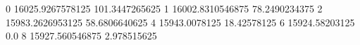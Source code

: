 0 16025.9267578125 101.3447265625
1 16002.8310546875 78.2490234375
2 15983.2626953125 58.6806640625
4 15943.0078125 18.42578125
6 15924.58203125 0.0
8 15927.560546875 2.978515625
